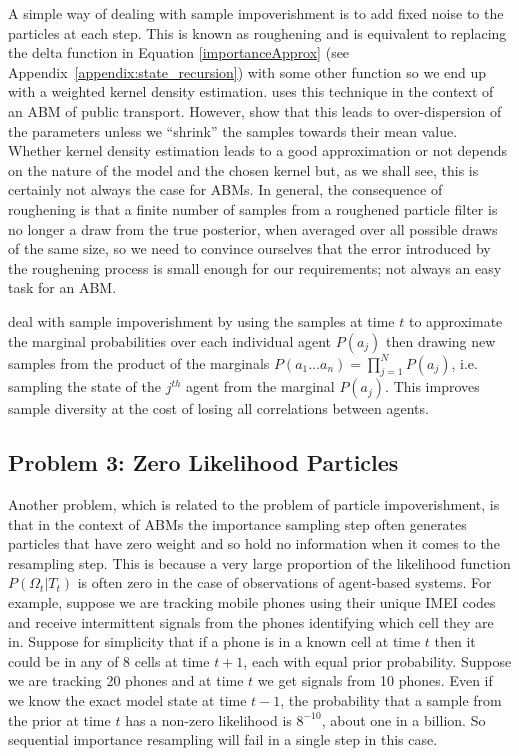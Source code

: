 \documentclass{article}
\begin{document}
A simple way of dealing with sample impoverishment is to add fixed noise to the particles at each step. This is known as roughening \citep*{gordon1993novel, li2014fight} and is equivalent to replacing the delta function in Equation \eqref{importanceApprox} (see Appendix~\ref{appendix:state_recursion}) with some other function so we end up with a weighted kernel density estimation. \citet{kieu_dealing_2020} uses this technique in the context of an ABM of public transport. However, \citet{liu2001combined} show that this leads to over-dispersion of the parameters unless we ``shrink'' the samples towards their mean value. Whether kernel density estimation leads to a good approximation or not depends on the nature of the model and the chosen kernel but, as we shall see, this is certainly not always the case for ABMs. In general, the consequence of roughening is that a finite number of samples from a roughened particle filter is no longer a draw from the true posterior, when averaged over all possible draws of the same size, so we need to convince ourselves that the error introduced by the roughening process is small enough for our requirements; not always an easy task for an ABM.

\citet{wang_data_2015} deal with sample impoverishment by using the samples at time $t$ to approximate the marginal probabilities over each individual agent $P(a_j)$ then drawing new samples from the product of the marginals $P(a_1 \dots a_n) = \prod_{j=1}^NP(a_j)$, i.e. sampling the state of the $j^{th}$ agent from the marginal $P(a_j)$. This improves sample diversity at the cost of losing all correlations between agents. 

\subsection{Problem 3: Zero Likelihood Particles}

Another problem, which is related to the problem of particle impoverishment, is that in the context of ABMs the importance sampling step often generates particles that have zero weight and so hold no information when it comes to the resampling step. This is because a very large proportion of the likelihood function $P(\Omega_t|T_t)$ is often zero in the case of observations of agent-based systems. For example, suppose we are tracking mobile phones using their unique IMEI codes and receive intermittent signals from the phones identifying which cell they are in. Suppose for simplicity that if a phone is in a known cell at time $t$ then it could be in any of 8 cells at time $t+1$, each with equal prior probability. Suppose we are tracking 20 phones and at time $t$ we get signals from 10 phones. Even if we know the exact model state at time $t-1$, the probability that a sample from the prior at time $t$ has a non-zero likelihood is $8^{-10}$, about one in a billion. So sequential importance resampling will fail in a single step in this case.
\end{document}
